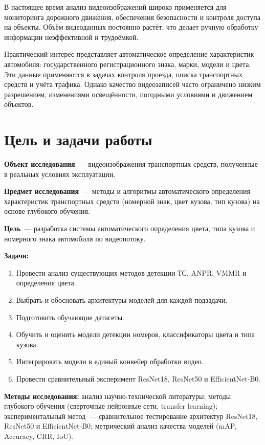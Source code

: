 \documentclass[10pt,a4paper]{report}
\numberwithin{equation}{chapter}
\numberwithin{figure}{chapter}
\numberwithin{table}{chapter}
\begin{document}
В настоящее время анализ видеоизображений широко применяется для мониторинга
дорожного движения, обеспечения безопасности и контроля доступа на объекты.
Объём видеоданных постоянно растёт, что делает ручную
обработку информации неэффективной и трудоёмкой.

Практический интерес представляет автоматическое определение характеристик
автомобиля: государственного регистрационного знака, марки, модели и цвета.
Эти данные применяются в задачах контроля проезда, поиска транспортных средств
и учёта трафика. Однако качество видеозаписей часто
ограничено низким разрешением, изменениями освещённости,
погодными условиями и движением объектов.

\section*{Цель и задачи работы}

\textbf{Объект исследования}~--- видеоизображения транспортных средств,
полученные в реальных условиях эксплуатации.

\textbf{Предмет исследования}~--- методы и алгоритмы автоматического определения
характеристик транспортных средств (номерной знак, цвет кузова, тип кузова)
на основе глубокого обучения.

\textbf{Цель}~--- разработка системы автоматического определения цвета,
типа кузова и номерного знака автомобиля по видеопотоку.

\textbf{Задачи:}
\begin{enumerate}
  \item Провести анализ существующих методов детекции ТС, ANPR, VMMR и определения цвета.
  \item Выбрать и обосновать архитектуры моделей для каждой подзадачи.
  \item Подготовить обучающие датасеты.
  \item Обучить и оценить модели детекции номеров, классификаторы цвета и типа кузова.
  \item Интегрировать модели в единый конвейер обработки видео.
  \item Провести сравнительный эксперимент ResNet18, ResNet50 и EfficientNet-B0.
\end{enumerate}

\textbf{Методы исследования:} анализ научно-технической
литературы; методы глубокого обучения (сверточные нейронные сети, transfer
learning); экспериментальный метод~--- сравнительное тестирование архитектур
ResNet18, ResNet50 и EfficientNet-B0; метрический анализ качества моделей (mAP, Accuracy,
CRR, IoU).
\end{document}
